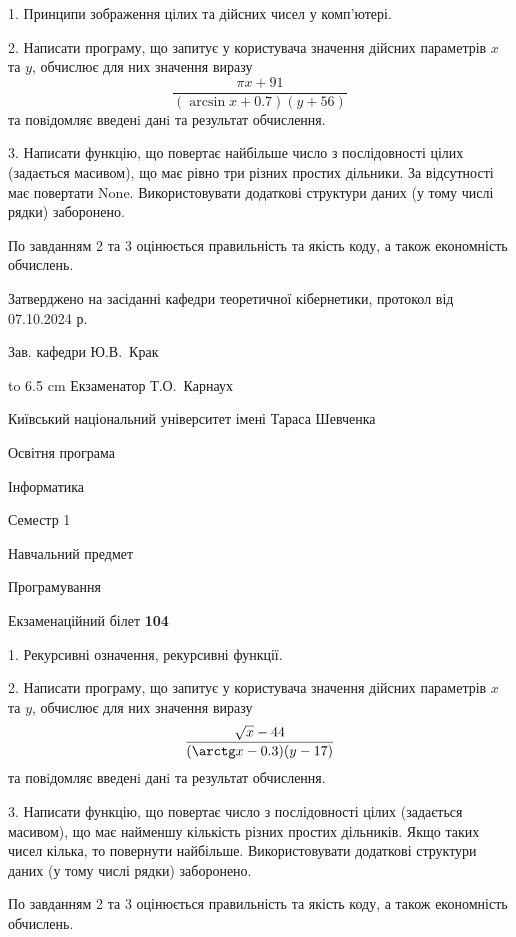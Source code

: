 \documentclass[12pt, ukrainian]{article}
\begin{document}
{%
1. Принципи зображення цілих та дійсних чисел у комп'ютері.%
\par
2. Написати програму, що запитує у користувача значення дійсних параметрів $x$ та $y$, обчислює для них значення виразу 
$$\frac{\pi x + 91}{(\arcsin x + 0.7) (y + 56)}$$ 
та повiдомляє введенi данi та результат обчислення.

\par
3. Написати функцію, що повертає найбільше число з послідовності цілих (задається масивом), що має рівно три різних простих дільники. За відсутності має повертати None. Використовувати додаткові структури даних (у тому числі рядки) заборонено.

По завданням 2 та 3 оцінюється правильність та якість коду, а також економність обчислень.

}
{\smallskip\smallskip \begin {scriptsize} Затверджено на засіданні кафедри теоретичної кібернетики, протокол   від   07.10.2024 р.\par\smallskip\smallskip\smallskip\smallskip
{\parbox {6.5 cm} {Зав. кафедри \dotfill Ю.В.~Крак}}\hspace {0.7cm} {\hbox to 6.5 cm { Екзаменатор \dotfill Т.О.~Карнаух}} \end{scriptsize}}
\vspace{0.9cm}
{{\begin {scriptsize}\par
{ \center  Київський національний університет імені Тараса Шевченка \par}
{\parbox {5 cm}{Освітня програма \hfill}{\parbox {7 cm}{Інформатика\hfill}}\parbox {6 cm}{\hfill Семестр 1}}\par
{\parbox {5 cm} {Навчальний предмет \hfill}\parbox {7 cm}{Програмування \hfill}\parbox {6cm}{\hfill}\par}\vspace{-15pt} \end{scriptsize}}{\center Екзаменаційний білет \No \textbf { 104 }\par}}
{%
1. Рекурсивні означення, рекурсивні функції.%
\par
2. Написати програму, що запитує у користувача значення дійсних параметрів $x$ та $y$, обчислює для них значення виразу 
$$\frac{\sqrt x - 44}{(\arctg x - 0.3) (y - 17)}$$ 
та повiдомляє введенi данi та результат обчислення.

\par
3. Написати функцію, що повертає число з послідовності цілих (задається масивом), що має найменшу кількість різних простих дільників. Якщо таких чисел кілька, то повернути найбільше. Використовувати додаткові структури даних (у тому числі рядки) заборонено.

По завданням 2 та 3 оцінюється правильність та якість коду, а також економність обчислень.

}
\end{document}
